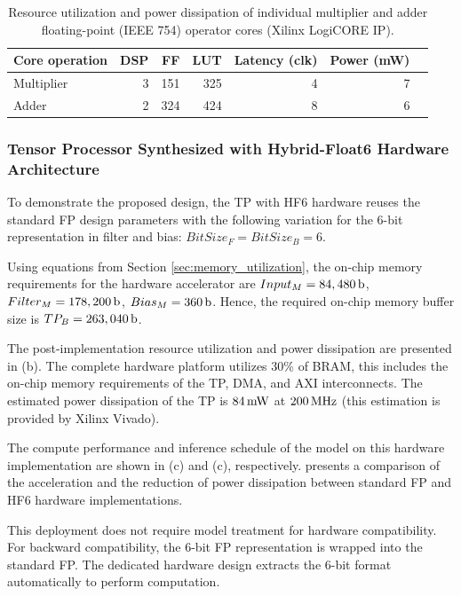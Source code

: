 \begin{table}[!h]\centering
	\caption{Resource utilization and power dissipation of individual multiplier and adder floating-point (IEEE 754) operator cores (Xilinx LogiCORE IP).}\label{tab:LogiCORE}
	\scriptsize
	\begin{tabular}{lrrrrrr}\toprule
		\textbf{Core operation} &\textbf{DSP} &\textbf{FF} &\textbf{LUT} &\textbf{Latency (clk)} &\textbf{Power (mW)} \\\midrule
		Multiplier &3 &151 &325 &4 &7 \\
		Adder &2 &324 &424 &8 &6 \\
		\bottomrule
	\end{tabular}
\end{table}



\subsubsection{Tensor Processor Synthesized with Hybrid-Float6 Hardware Architecture}
To demonstrate the proposed design, the TP with HF6 hardware reuses the standard FP design parameters with the following variation for the 6-bit representation in filter and bias: $BitSize_F=BitSize_B=6$.

Using equations from Section \ref{sec:memory_utilization}, the on-chip memory requirements for the hardware accelerator are $Input_M=\unit[84,480]{b}$, $Filter_M=\unit[178,200]{b}$, $Bias_M=\unit[360]{b}$. Hence, the required on-chip memory buffer size is $TP_B=\unit[263,040]{b}$.

The post-implementation resource utilization and power dissipation are presented in (b). The complete hardware platform utilizes 30\% of BRAM, this includes the on-chip memory requirements of the TP, DMA, and AXI interconnects. The estimated power dissipation of the TP is $\unit[84]{mW}$ at $\unit[200]{MHz}$ (this estimation is provided by Xilinx Vivado).

The compute performance and inference schedule of the model on this hardware implementation are shown in (c) and (c), respectively.  presents a comparison of the acceleration and the reduction of power dissipation between standard FP and HF6 hardware implementations.

This deployment does not require model treatment for hardware compatibility. For backward compatibility, the 6-bit FP representation is wrapped into the standard FP. The dedicated hardware design extracts the 6-bit format automatically to perform computation.

